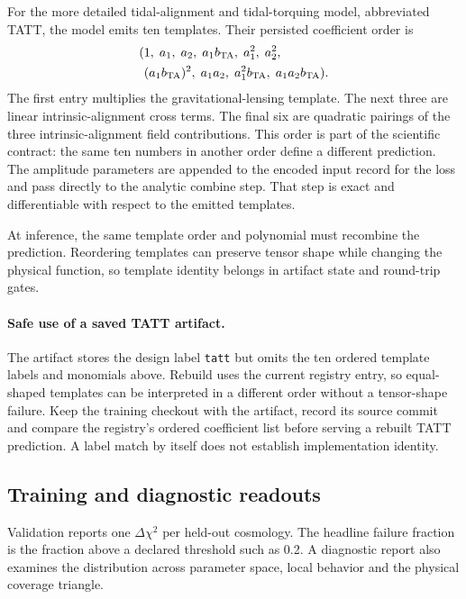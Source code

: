 \documentclass[10pt,aps,prd,twocolumn,nofootinbib]{revtex4-2}
\newcommand{\code}[1]{\texttt{#1}}
\begin{document}
For the more detailed tidal-alignment and tidal-torquing model, abbreviated
TATT, the model emits ten templates.  Their persisted coefficient order is
\begin{equation*}
\begin{aligned}
(&1,\;a_1,\;a_2,\;a_1b_{\rm TA},\;a_1^2,\;a_2^2,\\
 &(a_1b_{\rm TA})^2,\;a_1a_2,\;a_1^2b_{\rm TA},
   \;a_1a_2b_{\rm TA}).
\end{aligned}
\end{equation*}
The first entry multiplies the gravitational-lensing template.  The next
three are linear intrinsic-alignment cross terms.  The final six are quadratic
pairings of the three intrinsic-alignment field contributions.  This order is
part of the scientific contract: the same ten numbers in another order define
a different prediction.
The amplitude parameters are appended to the encoded input record for the
loss and pass directly to the analytic combine step.  That step is exact and
differentiable with respect to the emitted templates.

At inference, the same template order and polynomial must recombine the
prediction.  Reordering templates can preserve tensor shape while changing
the physical function, so template identity belongs in artifact state and
round-trip gates.

\paragraph{Safe use of a saved TATT artifact.}
The artifact stores the design label \code{tatt} but omits the ten ordered
template labels and monomials above.  Rebuild uses the current registry entry,
so equal-shaped templates can be interpreted in a different order without a
tensor-shape failure.  Keep the training checkout with the artifact, record its
source commit and compare the registry's ordered coefficient list before
serving a rebuilt TATT prediction.  A label match by itself does not establish
implementation identity.

\subsection{Training and diagnostic readouts}

Validation reports one \(\Delta\chi^2\) per held-out cosmology.  The headline
failure fraction is the fraction above a declared threshold such as 0.2.  A
diagnostic report also examines the distribution across parameter space,
local behavior and the physical coverage triangle.
\end{document}
